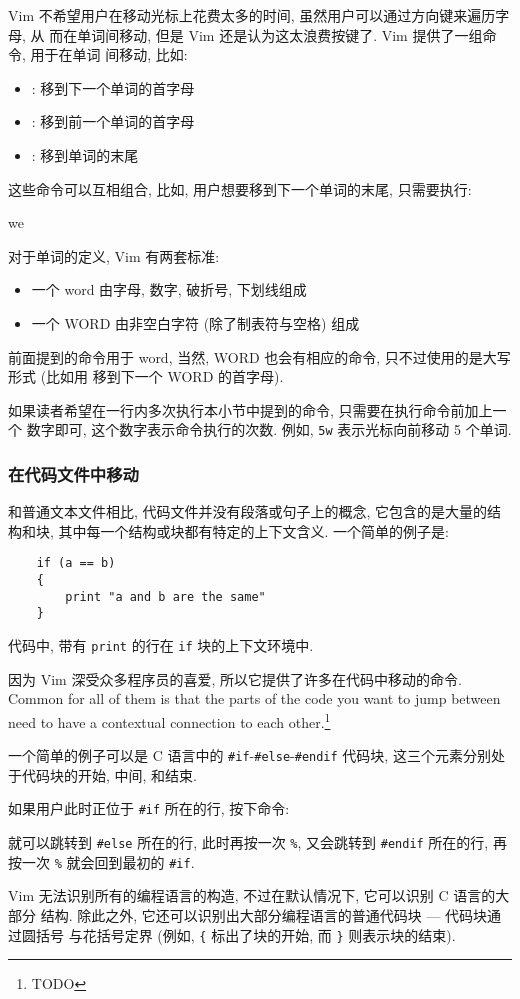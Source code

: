 Vim 不希望用户在移动光标上花费太多的时间, 虽然用户可以通过方向键来遍历字母, 从
而在单词间移动, 但是 Vim 还是认为这太浪费按键了. Vim 提供了一组命令, 用于在单词
间移动, 比如:
\begin{itemize}
    \item {}: 移到下一个单词的首字母
    \item {}: 移到前一个单词的首字母
    \item {}: 移到单词的末尾
\end{itemize}
这些命令可以互相组合, 比如, 用户想要移到下一个单词的末尾, 只需要执行:
\begin{vimcmd}
we
\end{vimcmd}

对于单词的定义, Vim 有两套标准:
\begin{itemize}
    \item 一个 word 由字母, 数字, 破折号, 下划线组成
    \item 一个 WORD 由非空白字符 (除了制表符与空格) 组成
\end{itemize}
前面提到的命令用于 word, 当然, WORD 也会有相应的命令, 只不过使用的是大写形式
(比如用  移到下一个 WORD 的首字母).
\begin{warning}
    如果读者希望在一行内多次执行本小节中提到的命令, 只需要在执行命令前加上一个
    数字即可, 这个数字表示命令执行的次数. 例如, \texttt{5w} 表示光标向前移动 5
    个单词.
\end{warning}

\subsubsection{在代码文件中移动}
\label{subsubsec:moving_in_a_code_file}

和普通文本文件相比, 代码文件并没有段落或句子上的概念, 它包含的是大量的结构和块,
其中每一个结构或块都有特定的上下文含义. 一个简单的例子是:
\begin{verbatim}
    if (a == b)
    {
        print "a and b are the same"
    }
\end{verbatim}
代码中, 带有 \texttt{print} 的行在 \texttt{if} 块的上下文环境中.

因为 Vim 深受众多程序员的喜爱, 所以它提供了许多在代码中移动的命令. Common for
all of them is that the parts of the code you want to jump between need to have
a contextual connection to each other.\footnote{TODO}

一个简单的例子可以是 C 语言中的 \texttt{#if}-\texttt{#else}-\texttt{#endif}
代码块, 这三个元素分别处于代码块的开始, 中间, 和结束.

如果用户此时正位于 \texttt{#if} 所在的行, 按下命令:
\begin{vimcmd}
%
\end{vimcmd}
就可以跳转到 \texttt{#else} 所在的行, 此时再按一次 \verb'%', 又会跳转到
\texttt{#endif} 所在的行, 再按一次 \verb'%' 就会回到最初的 \texttt{#if}.

Vim 无法识别所有的编程语言的构造, 不过在默认情况下, 它可以识别 C 语言的大部分
结构. 除此之外, 它还可以识别出大部分编程语言的普通代码块 --- 代码块通过圆括号
与花括号定界 (例如, \verb'{' 标出了块的开始, 而 \verb'}' 则表示块的结束).
